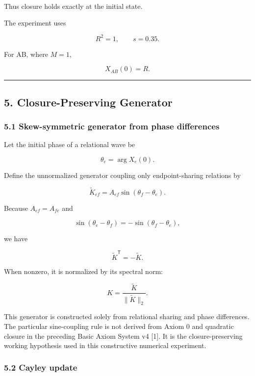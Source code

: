 \documentclass[
  10pt,
  a4paper,
]{article}
\begin{document}
Thus closure holds exactly at the initial state.

The experiment uses

\[
R^2=1,
\qquad
s=0.35.
\]

For AB, where \(M=1\),

\[
X_{AB}(0)=R.
\]

\begin{center}\rule{0.5\linewidth}{0.5pt}\end{center}

\subsection{5. Closure-Preserving
Generator}\label{closure-preserving-generator}

\subsubsection{5.1 Skew-symmetric generator from phase
differences}\label{skew-symmetric-generator-from-phase-differences}

Let the initial phase of a relational wave be

\[
\theta_e=\arg X_e(0).
\]

Define the unnormalized generator coupling only endpoint-sharing
relations by

\[
\widetilde K_{ef}
=
A_{ef}\sin(\theta_f-\theta_e).
\]

Because \(A_{ef}=A_{fe}\) and

\[
\sin(\theta_e-\theta_f)
=
-\sin(\theta_f-\theta_e),
\]

we have

\[
\widetilde K^{\mathsf T}
=
-\widetilde K.
\]

When nonzero, it is normalized by its spectral norm:

\[
K
=
\frac{\widetilde K}{\lVert\widetilde K\rVert_2}.
\]

This generator is constructed solely from relational sharing and phase
differences. The particular sine-coupling rule is not derived from Axiom
0 and quadratic closure in the preceding Basic Axiom System v4 {[}1{]}.
It is the closure-preserving working hypothesis used in this
constructive numerical experiment.

\subsubsection{5.2 Cayley update}\label{cayley-update}
\end{document}
